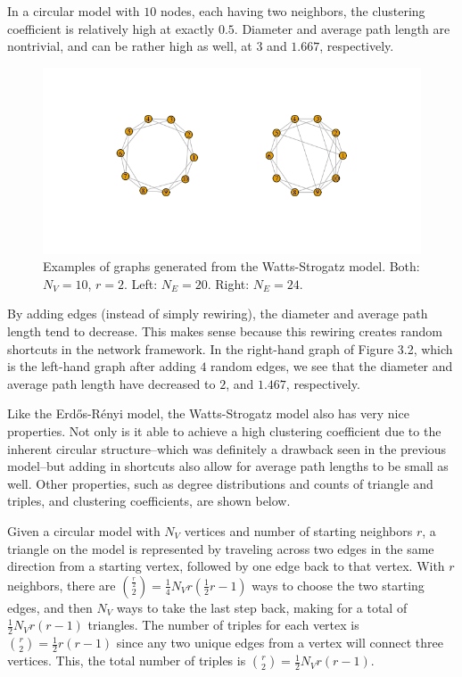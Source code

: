 \documentclass[12pt,twoside]{amherstthesis}
\begin{document}
  In a circular model with \(10\) nodes, each having two neighbors, the
  clustering coefficient is relatively high at exactly \(0.5\). Diameter
  and average path length are nontrivial, and can be rather high as well,
  at \(3\) and \(1.667\), respectively.
  
  \begin{figure}[htbp]
  \centering
  \includegraphics{figure/22wattsstrogatzexample.png}
  \caption{Examples of graphs generated from the Watts-Strogatz model.
  Both: \(N_V = 10\), \(r = 2\). Left: \(N_E = 20\). Right: \(N_E = 24\).}
  \end{figure}
  
  By adding edges (instead of simply rewiring), the diameter and average
  path length tend to decrease. This makes sense because this rewiring
  creates random shortcuts in the network framework. In the right-hand
  graph of Figure 3.2, which is the left-hand graph after adding \(4\)
  random edges, we see that the diameter and average path length have
  decreased to \(2\), and \(1.467\), respectively.
  
  Like the Erdős-Rényi model, the Watts-Strogatz model also has very nice
  properties. Not only is it able to achieve a high clustering coefficient
  due to the inherent circular structure--which was definitely a drawback
  seen in the previous model--but adding in shortcuts also allow for
  average path lengths to be small as well. Other properties, such as
  degree distributions and counts of triangle and triples, and clustering
  coefficients, are shown below.
  
  Given a circular model with \(N_{V}\) vertices and number of starting
  neighbors \(r\), a triangle on the model is represented by traveling
  across two edges in the same direction from a starting vertex, followed
  by one edge back to that vertex. With \(r\) neighbors, there are
  \({\frac {r} {2} \choose 2} = \frac {1} {4} N_{V} r \left(\frac {1} {2} r - 1 \right)\)
  ways to choose the two starting edges, and then \(N_V\) ways to take the
  last step back, making for a total of \(\frac {1} {2} N_{V} r(r - 1)\)
  triangles. The number of triples for each vertex is
  \({r \choose 2} = \frac {1} {2}r(r - 1)\) since any two unique edges
  from a vertex will connect three vertices. This, the total number of
  triples is \({r \choose 2} = \frac {1} {2}N_{V}r(r - 1)\).
  
\end{document}
